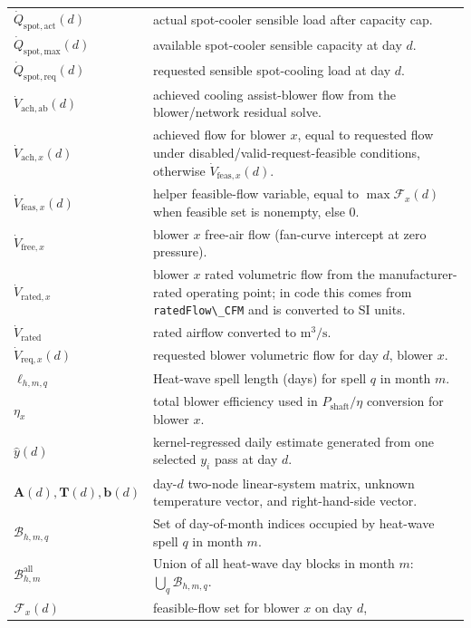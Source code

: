{\begin{longtable}[]{@{}
  >{\raggedright\arraybackslash}p{}
  >{\raggedright\arraybackslash}p{}@{}}
\(\dot Q_{\mathrm{spot,act}}(d)\) & actual spot-cooler sensible load
after capacity cap. \\
\(\dot Q_{\mathrm{spot,max}}(d)\) & available spot-cooler sensible
capacity at day \(d\). \\
\(\dot Q_{\mathrm{spot,req}}(d)\) & requested sensible spot-cooling load
at day \(d\). \\
\(\dot V_{\mathrm{ach},\mathrm{ab}}(d)\) & achieved cooling
assist-blower flow from the blower/network residual solve. \\
\(\dot V_{\mathrm{ach},x}(d)\) & achieved flow for blower \(x\), equal
to requested flow under disabled/valid-request-feasible conditions,
otherwise \(\dot V_{\mathrm{feas},x}(d)\). \\
\(\dot V_{\mathrm{feas},x}(d)\) & helper feasible-flow variable, equal
to \(\max\mathcal{F}_x(d)\) when feasible set is nonempty, else
\(0\). \\
\(\dot V_{\mathrm{free},x}\) & blower \(x\) free-air flow (fan-curve
intercept at zero pressure). \\
\(\dot V_{\mathrm{rated},x}\) & blower \(x\) rated volumetric flow from
the manufacturer-rated operating point; in code this comes from
\texttt{ratedFlow\textbackslash{}\_CFM} and is converted to SI units. \\
\(\dot V_{\mathrm{rated}}\) & rated airflow converted to
\(\mathrm{m^3/s}\). \\
\(\dot V_{\mathrm{req},x}(d)\) & requested blower volumetric flow for
day \(d\), blower \(x\). \\
\(\ell_{h,m,q}\) & Heat-wave spell length (days) for spell \(q\) in
month \(m\). \\
\(\eta_x\) & total blower efficiency used in \(P_{\mathrm{shaft}}/\eta\)
conversion for blower \(x\). \\
\(\hat y(d)\) & kernel-regressed daily estimate generated from one
selected \(y_i\) pass at day \(d\). \\
\(\mathbf{A}(d),\mathbf{T}(d),\mathbf{b}(d)\) & day-\(d\) two-node
linear-system matrix, unknown temperature vector, and right-hand-side
vector. \\
\(\mathcal{B}_{h,m,q}\) & Set of day-of-month indices occupied by
heat-wave spell \(q\) in month \(m\). \\
\(\mathcal{B}_{h,m}^{\mathrm{all}}\) & Union of all heat-wave day blocks
in month \(m\): \(\bigcup_q \mathcal{B}_{h,m,q}\). \\
\(\mathcal{F}_x(d)\) & feasible-flow set for blower \(x\) on day \(d\),

\end{longtable}}
